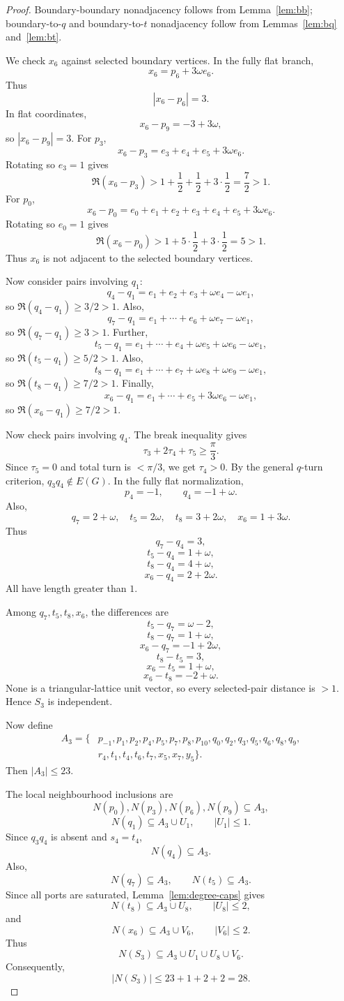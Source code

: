 \documentclass[11pt]{article}
\theoremstyle{plain}
\numberwithin{equation}{section}
\begin{document}
\begin{proof}
Boundary-boundary nonadjacency follows from Lemma~\ref{lem:bb}; boundary-to-$q$ and boundary-to-$t$ nonadjacency follow from Lemmas~\ref{lem:bq} and~\ref{lem:bt}.

We check $x_6$ against selected boundary vertices. In the fully flat branch,
\[
 x_6=p_6+3\omega e_6.
\]
Thus
\[
 |x_6-p_6|=3.
\]
In flat coordinates,
\[
 x_6-p_9=-3+3\omega,
\]
so $|x_6-p_9|=3$. For $p_3$,
\[
 x_6-p_3=e_3+e_4+e_5+3\omega e_6.
\]
Rotating so $e_3=1$ gives
\[
 \Re(x_6-p_3)>1+\frac12+\frac12+3\cdot\frac12=\frac72>1.
\]
For $p_0$,
\[
 x_6-p_0=e_0+e_1+e_2+e_3+e_4+e_5+3\omega e_6.
\]
Rotating so $e_0=1$ gives
\[
 \Re(x_6-p_0)>1+5\cdot\frac12+3\cdot\frac12=5>1.
\]
Thus $x_6$ is not adjacent to the selected boundary vertices.

Now consider pairs involving $q_1$:
\[
 q_4-q_1=e_1+e_2+e_3+\omega e_4-\omega e_1,
\]
so $\Re(q_4-q_1)\ge3/2>1$.
Also,
\[
 q_7-q_1=e_1+\cdots+e_6+\omega e_7-\omega e_1,
\]
so $\Re(q_7-q_1)\ge3>1$.
Further,
\[
 t_5-q_1=e_1+\cdots+e_4+\omega e_5+\omega e_6-\omega e_1,
\]
so $\Re(t_5-q_1)\ge5/2>1$.
Also,
\[
 t_8-q_1=e_1+\cdots+e_7+\omega e_8+\omega e_9-\omega e_1,
\]
so $\Re(t_8-q_1)\ge7/2>1$.
Finally,
\[
 x_6-q_1=e_1+\cdots+e_5+3\omega e_6-\omega e_1,
\]
so $\Re(x_6-q_1)\ge7/2>1$.

Now check pairs involving $q_4$. The break inequality gives
\[
 \tau_3+2\tau_4+\tau_5\ge\frac{\pi}{3}.
\]
Since $\tau_5=0$ and total turn is $<\pi/3$, we get $\tau_4>0$. By the general $q$-turn criterion, $q_3q_4\notin E(G)$.
In the fully flat normalization,
\[
 p_4=-1,
 \qquad q_4=-1+\omega.
\]
Also,
\[
 q_7=2+\omega,
 \quad t_5=2\omega,
 \quad t_8=3+2\omega,
 \quad x_6=1+3\omega.
\]
Thus
\[
 q_7-q_4=3,
\]
\[
 t_5-q_4=1+\omega,
\]
\[
 t_8-q_4=4+\omega,
\]
\[
 x_6-q_4=2+2\omega.
\]
All have length greater than $1$.

Among $q_7,t_5,t_8,x_6$, the differences are
\[
 t_5-q_7=\omega-2,
\]
\[
 t_8-q_7=1+\omega,
\]
\[
 x_6-q_7=-1+2\omega,
\]
\[
 t_8-t_5=3,
\]
\[
 x_6-t_5=1+\omega,
\]
\[
 x_6-t_8=-2+\omega.
\]
None is a triangular-lattice unit vector, so every selected-pair distance is $>1$. Hence $S_3$ is independent.

Now define
\[
\begin{aligned}
A_3=\{&p_{-1},p_1,p_2,p_4,p_5,p_7,p_8,p_{10},q_0,q_2,q_3,q_5,q_6,q_8,q_9,\\
&r_4,t_1,t_4,t_6,t_7,x_5,x_7,y_5\}.
\end{aligned}
\]
Then $|A_3|\le23$.

The local neighbourhood inclusions are
\[
 N(p_0),N(p_3),N(p_6),N(p_9)\subseteq A_3,
\]
\[
 N(q_1)\subseteq A_3\cup U_1,
 \qquad |U_1|\le1.
\]
Since $q_3q_4$ is absent and $s_4=t_4$,
\[
 N(q_4)\subseteq A_3.
\]
Also,
\[
 N(q_7)\subseteq A_3,
 \qquad N(t_5)\subseteq A_3.
\]
Since all ports are saturated, Lemma~\ref{lem:degree-caps} gives
\[
 N(t_8)\subseteq A_3\cup U_8,
 \qquad |U_8|\le2,
\]
and
\[
 N(x_6)\subseteq A_3\cup V_6,
 \qquad |V_6|\le2.
\]
Thus
\[
 N(S_3)\subseteq A_3\cup U_1\cup U_8\cup V_6.
\]
Consequently,
\[
 |N(S_3)|\le23+1+2+2=28.
\]
\end{proof}
\end{document}
